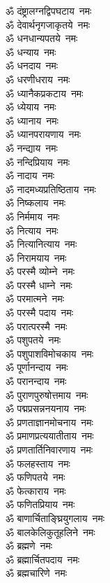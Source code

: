 \begin{multicols}{2}
\begin{flushleft}
ॐ दंष्ट्रालग्नद्विपघटाय~नमः\\
ॐ देवार्थनृगजाकृतये~नमः\\
ॐ धनधान्यपतये~नमः\\
ॐ धन्याय~नमः\\
ॐ धनदाय~नमः\\
ॐ धरणीधराय~नमः\\
ॐ ध्यानैकप्रकटाय~नमः\hfill{}\\
ॐ ध्येयाय~नमः\\
ॐ ध्यानाय~नमः\\
ॐ ध्यानपरायणाय~नमः\\
ॐ नन्द्याय~नमः\\
ॐ नन्दिप्रियाय~नमः\\
ॐ नादाय~नमः\\
ॐ नादमध्यप्रतिष्ठिताय~नमः\\
ॐ निष्कलाय~नमः\\
ॐ निर्ममाय~नमः\\
ॐ नित्याय~नमः\hfill{}\\
ॐ नित्यानित्याय~नमः\\
ॐ निरामयाय~नमः\\
ॐ परस्मै व्योम्ने~नमः\\
ॐ परस्मै धाम्ने~नमः\\
ॐ परमात्मने~नमः\\
ॐ परस्मै पदाय~नमः\\
ॐ परात्परस्मै~नमः\\
ॐ पशुपतये~नमः\\
ॐ पशुपाशविमोचकाय~नमः\\
ॐ पूर्णानन्दाय~नमः\hfill{}\\
ॐ परानन्दाय~नमः\\
ॐ पुराणपुरुषोत्तमाय~नमः\\
ॐ पद्मप्रसन्ननयनाय~नमः\\
ॐ प्रणताज्ञानमोचनाय~नमः\\
ॐ प्रमाणप्रत्ययातीताय~नमः\\
ॐ प्रणतार्तिनिवारणाय~नमः\\
ॐ फलहस्ताय~नमः\\
ॐ फणिपतये~नमः\\
ॐ फेत्काराय~नमः\\
ॐ फणितप्रियाय~नमः\hfill{}\\
ॐ बाणार्चिताङ्घ्रियुगलाय~नमः\\
ॐ बालकेलिकुतूहलिने~नमः\\
ॐ ब्रह्मणे~नमः\\
ॐ ब्रह्मार्चितपदाय~नमः\\
ॐ ब्रह्मचारिणे~नमः\\

\end{flushleft}
\end{multicols}
